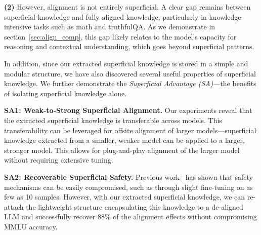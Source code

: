 
\textbf{(2)} However, alignment is not entirely superficial. A clear gap remains between superficial knowledge and fully aligned knowledge, particularly in knowledge-intensive tasks such as math and truthfulQA. As we demonstrate in section~\ref{sec:align_comp}, this gap likely relates to the model’s capacity for reasoning and contextual understanding, which goes beyond superficial patterns.




In addition, since our extracted superficial knowledge is stored in a simple and modular structure, we have also discovered several useful properties of superficial knowledge. We further demonstrate the \textit{Superficial Advantage (SA)}—the benefits of isolating superficial knowledge alone.

\textbf{SA1: Weak-to-Strong Superficial Alignment.} Our experiments reveal that the extracted superficial knowledge is transferable across models. This transferability can be leveraged for offsite alignment of larger models—superficial knowledge extracted from a smaller, weaker model can be applied to a larger, stronger model. This allows for plug-and-play alignment of the larger model without requiring extensive tuning.

\textbf{SA2: Recoverable Superficial Safety.} Previous work~\citep{alignattack,wei2024jailbroken} has shown that safety mechanisms can be easily compromised, such as through slight fine-tuning on as few as 10 samples. However, with our extracted superficial knowledge, we can re-attach the lightweight structure encapsulating this knowledge to a de-aligned LLM and successfully recover 88\% of the alignment effects without compromising MMLU accuracy.











